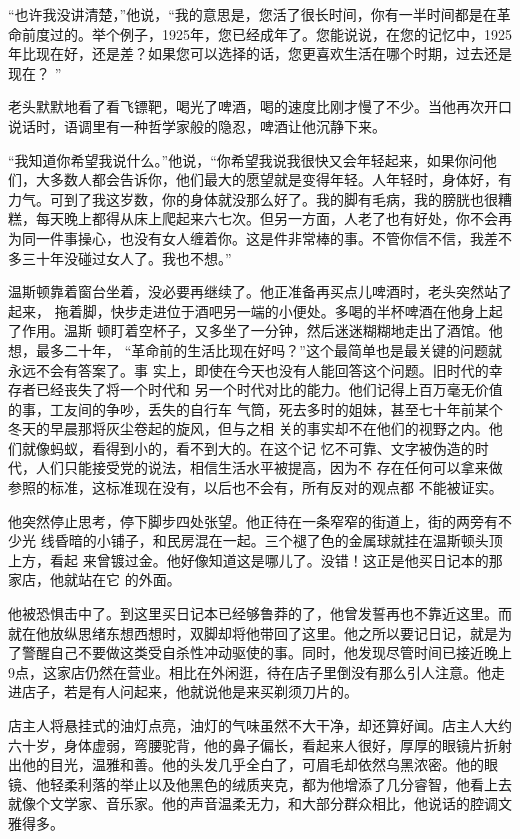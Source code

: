 ``也许我没讲清楚，''他说，``我的意思是，您活了很长时间，你有一半时间都是在革命前度过的。举个例子，1925年，您已经成年了。您能说说，在您的记忆中，1925年比现在好，还是差？如果您可以选择的话，您更喜欢生活在哪个时期，过去还是现在？
''

老头默默地看了看飞镖靶，喝光了啤酒，喝的速度比刚才慢了不少。当他再次开口说话时，语调里有一种哲学家般的隐忍，啤酒让他沉静下来。

``我知道你希望我说什么。''他说，``你希望我说我很快又会年轻起来，如果你问他们，大多数人都会告诉你，他们最大的愿望就是变得年轻。人年轻时，身体好，有力气。可到了我这岁数，你的身体就没那么好了。我的脚有毛病，我的膀胱也很糟糕，每天晚上都得从床上爬起来六七次。但另一方面，人老了也有好处，你不会再为同一件事操心，也没有女人缠着你。这是件非常棒的事。不管你信不信，我差不多三十年没碰过女人了。我也不想。''

温斯顿靠着窗台坐着，没必要再继续了。他正准备再买点儿啤酒时，老头突然站了起来，
拖着脚，快步走进位于酒吧另一端的小便处。多喝的半杯啤酒在他身上起了作用。温斯
顿盯着空杯子，又多坐了一分钟，然后迷迷糊糊地走出了酒馆。他想，最多二十年，
``革命前的生活比现在好吗？''这个最简单也是最关键的问题就永远不会有答案了。事
实上，即使在今天也没有人能回答这个问题。旧时代的幸存者已经丧失了将一个时代和
另一个时代对比的能力。他们记得上百万毫无价值的事，工友间的争吵，丢失的自行车
气筒，死去多时的姐妹，甚至七十年前某个冬天的早晨那将灰尘卷起的旋风，但与之相
关的事实却不在他们的视野之内。他们就像蚂蚁，看得到小的，看不到大的。在这个记
忆不可靠、文字被伪造的时代，人们只能接受党的说法，相信生活水平被提高，因为不
存在任何可以拿来做参照的标准，这标准现在没有，以后也不会有，所有反对的观点都
不能被证实。

他突然停止思考，停下脚步四处张望。他正待在一条窄窄的街道上，街的两旁有不少光
线昏暗的小铺子，和民房混在一起。三个褪了色的金属球就挂在温斯顿头顶上方，看起
来曾镀过金。他好像知道这是哪儿了。没错！这正是他买日记本的那家店，他就站在它
的外面。

他被恐惧击中了。到这里买日记本已经够鲁莽的了，他曾发誓再也不靠近这里。而就在他放纵思绪东想西想时，双脚却将他带回了这里。他之所以要记日记，就是为了警醒自己不要做这类受自杀性冲动驱使的事。同时，他发现尽管时间已接近晚上9点，这家店仍然在营业。相比在外闲逛，待在店子里倒没有那么引人注意。他走进店子，若是有人问起来，他就说他是来买剃须刀片的。

店主人将悬挂式的油灯点亮，油灯的气味虽然不大干净，却还算好闻。店主人大约六十岁，身体虚弱，弯腰驼背，他的鼻子偏长，看起来人很好，厚厚的眼镜片折射出他的目光，温雅和善。他的头发几乎全白了，可眉毛却依然乌黑浓密。他的眼镜、他轻柔利落的举止以及他黑色的绒质夹克，都为他增添了几分睿智，他看上去就像个文学家、音乐家。他的声音温柔无力，和大部分群众相比，他说话的腔调文雅得多。

